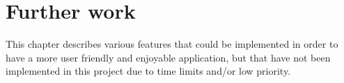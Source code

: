 \chapter{Further work}

This chapter describes various features that could be implemented in order to have a 
more user friendly and enjoyable application, but that have not been implemented in 
this project due to time limits and/or low priority.